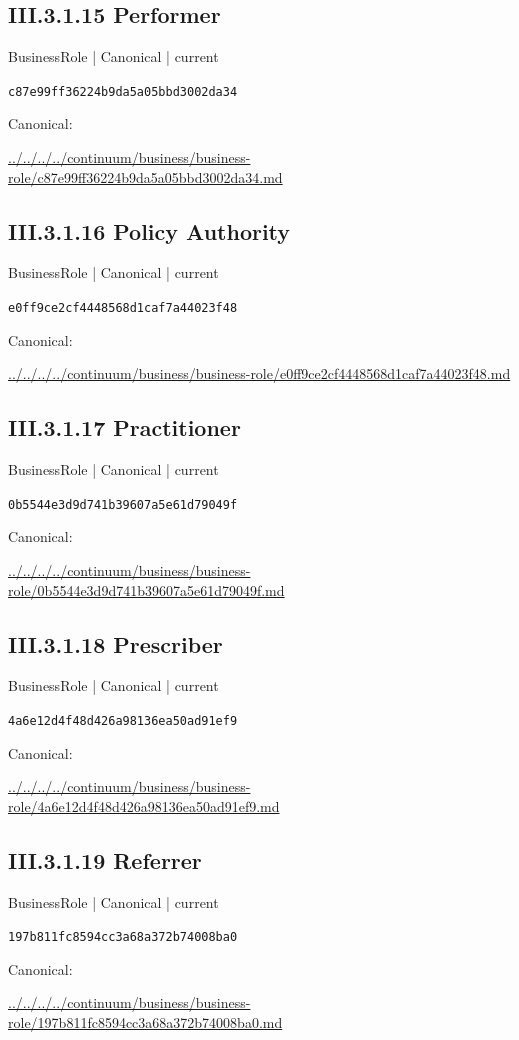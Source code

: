 \documentclass[10pt,a4paper]{article}
\begin{document}
\subsection*{III.3.1.15 Performer}
\label{element-c87e99ff36224b9da5a05bbd3002da34}
{\small BusinessRole | Canonical | current}\par
\texttt{c87e99ff36224b9da5a05bbd3002da34}\par
Canonical: \par
{\footnotesize\url{../../../../continuum/business/business-role/c87e99ff36224b9da5a05bbd3002da34.md}}\par
\subsection*{III.3.1.16 Policy Authority}
\label{element-e0ff9ce2cf4448568d1caf7a44023f48}
{\small BusinessRole | Canonical | current}\par
\texttt{e0ff9ce2cf4448568d1caf7a44023f48}\par
Canonical: \par
{\footnotesize\url{../../../../continuum/business/business-role/e0ff9ce2cf4448568d1caf7a44023f48.md}}\par
\subsection*{III.3.1.17 Practitioner}
\label{element-0b5544e3d9d741b39607a5e61d79049f}
{\small BusinessRole | Canonical | current}\par
\texttt{0b5544e3d9d741b39607a5e61d79049f}\par
Canonical: \par
{\footnotesize\url{../../../../continuum/business/business-role/0b5544e3d9d741b39607a5e61d79049f.md}}\par
\subsection*{III.3.1.18 Prescriber}
\label{element-4a6e12d4f48d426a98136ea50ad91ef9}
{\small BusinessRole | Canonical | current}\par
\texttt{4a6e12d4f48d426a98136ea50ad91ef9}\par
Canonical: \par
{\footnotesize\url{../../../../continuum/business/business-role/4a6e12d4f48d426a98136ea50ad91ef9.md}}\par
\subsection*{III.3.1.19 Referrer}
\label{element-197b811fc8594cc3a68a372b74008ba0}
{\small BusinessRole | Canonical | current}\par
\texttt{197b811fc8594cc3a68a372b74008ba0}\par
Canonical: \par
{\footnotesize\url{../../../../continuum/business/business-role/197b811fc8594cc3a68a372b74008ba0.md}}\par
\end{document}
